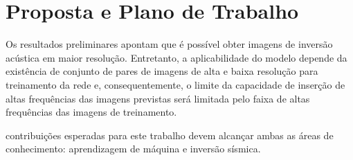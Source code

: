 % 
% 
% 




\section{Proposta e Plano de Trabalho}

Os resultados preliminares apontam que é possível obter imagens de
inversão acústica em maior resolução. Entretanto, a aplicabilidade
do modelo depende da existência de conjunto de pares de imagens
de alta e baixa resolução para treinamento da rede e, consequentemente,
o limite da capacidade de inserção de altas frequências das imagens previstas
será limitada pelo faixa de altas frequências das imagens de treinamento.

contribuições esperadas para este trabalho devem alcançar ambas as
áreas de conhecimento: aprendizagem de máquina e inversão sísmica.


